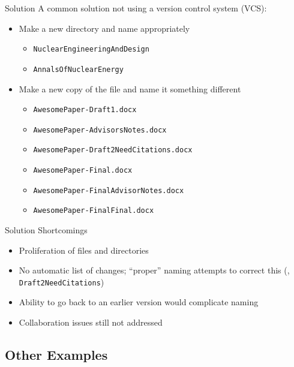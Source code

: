\documentclass[10pt,t,xcolor=table]{UWMadBeamer}
\newenvironment{Itemize}
    {\begin{itemize}\setlength{\itemsep}{0.50em}\setlength{\leftmargin}{0.0em}\setlength{\labelwidth}{0em}}
    {\end{itemize}}
\begin{document}
    \begin{frame}{Solution}
        A common solution not using a version control system (VCS):

        \begin{Itemize}
            \item{Make a new directory and name appropriately}
            \begin{Itemize}
                \item{\texttt{NuclearEngineeringAndDesign}}
                \item{\texttt{AnnalsOfNuclearEnergy}}
            \end{Itemize}
            \item{Make a new copy of the file and name it something different}
            \begin{Itemize}
                \item{\texttt{AwesomePaper-Draft1.docx}}
                \item{\texttt{AwesomePaper-AdvisorsNotes.docx}}
                \item{\texttt{AwesomePaper-Draft2NeedCitations.docx}}
                \item{\texttt{AwesomePaper-Final.docx}}
                \item{\texttt{AwesomePaper-FinalAdvisorNotes.docx}}
                \item{\texttt{AwesomePaper-FinalFinal.docx}}
            \end{Itemize}
        \end{Itemize}
    \end{frame}

    \begin{frame}{Solution Shortcomings}
        \begin{Itemize}
            \item{Proliferation of files and directories}
            \item{No automatic list of changes; ``proper'' naming attempts to correct this (\eg{}, \texttt{Draft2NeedCitations})}
            \item{Ability to go back to an earlier version would complicate naming}
            \item{Collaboration issues still not addressed}
        \end{Itemize}
    \end{frame}

    \subsection{Other Examples}
\end{document}
